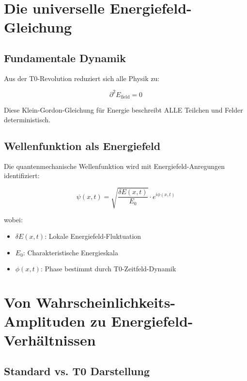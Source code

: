\documentclass[12pt,a4paper]{report}
\begin{document}
	\section{Die universelle Energiefeld-Gleichung}
	\label{sec:universal_field_equation}
	
	\subsection{Fundamentale Dynamik}
	\label{subsec:fundamental_dynamics}
	
	Aus der T0-Revolution reduziert sich alle Physik zu:
	
	\begin{equation}
		\boxed{\partial^2 E_{\text{field}} = 0}
		\label{eq:universal_field_equation}
	\end{equation}
	
	Diese Klein-Gordon-Gleichung für Energie beschreibt ALLE Teilchen und Felder deterministisch.
	
	\subsection{Wellenfunktion als Energiefeld}
	\label{subsec:wave_function_energy_field}
	
	Die quantenmechanische Wellenfunktion wird mit Energiefeld-Anregungen identifiziert:
	
	\begin{equation}
		\psi(x,t) = \sqrt{\frac{\delta E(x,t)}{E_0}} \cdot e^{i\phi(x,t)}
		\label{eq:wave_function_energy}
	\end{equation}
	
	wobei:
	\begin{itemize}
		\item $\delta E(x,t)$: Lokale Energiefeld-Fluktuation
		\item $E_0$: Charakteristische Energieskala
		\item $\phi(x,t)$: Phase bestimmt durch T0-Zeitfeld-Dynamik
	\end{itemize}
	
	\section{Von Wahrscheinlichkeits-Amplituden zu Energiefeld-Verhältnissen}
	\label{sec:amplitudes_to_ratios}
	
	\subsection{Standard vs. T0 Darstellung}
	\label{subsec:standard_vs_t0}
	
\end{document}

